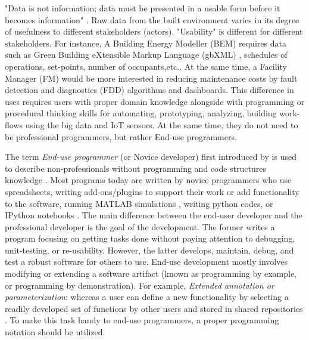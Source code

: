 \documentclass{scsSimAUDPaperFormat}
\begin{document}
"Data is not information; data must be presented in a usable form before it becomes information" \cite[p.134]{Reen1996UsabilityFramework}. Raw data from the built environment varies in its degree of usefulness to different stakeholders (actors). "Usability" is different for different stakeholders. For instance, A Building Energy Modeller (BEM) requires data such as Green Building eXtensible Markup Language (gbXML) \cite{GreenBuildingXMLgbXMLSchema2019GbXMLSchema}, schedules of operations, set-points, number of occupants,etc.. At the same time, a Facility Manager (FM) would be more interested in reducing maintenance costs by fault detection and diagnostics (FDD)\cite{Zibion2018DevelopmentInformation} algorithms and dashboards. This difference in uses requires users with proper domain knowledge alongside with programming or procedural thinking skills for automating, prototyping, analyzing, building work-flows using the big data and IoT sensors. At the same time, they do not need to be professional programmers, but rather End-use programmers.

The term \textit{End-use programmer} (or Novice developer) first introduced by \cite{Nardi1993AComputing} is used to describe non-professionals without programming and code structures knowledge \cite{InteractionDesignFoundation2014End-UserEd.}. Most programs today are written by novice programmers \cite{Rothermel2011TheEngineering} who use spreadsheets, writing add-ons/plugins to support their work or add functionality to the software, running MATLAB simulations \cite{Mathworks2016MATLABSimulink}, writing python codes, or IPython notebooks \cite{ScaffidiEstimatingProgrammers}. The main difference between the end-user developer and the professional developer is the goal of the development. The former writes a program focusing on getting tasks done without paying attention to debugging, unit-testing, or re-usability. However, the latter develops, maintain, debug, and test a robust software for others to use\cite{LiebermanEnd-userDevelopment}. End-use development mostly involves modifying or extending a software artifact (known as programming by example, or programming by demonstration). For example, \textit{Extended annotation or parameterization}: whereas a user can define a new functionality by selecting a readily developed set of functions by other users and stored in shared repositories \cite{Lieberman2006End-UserParadigm}. To make this task handy to end-use programmers, a proper programming notation should be utilized.
\end{document}
